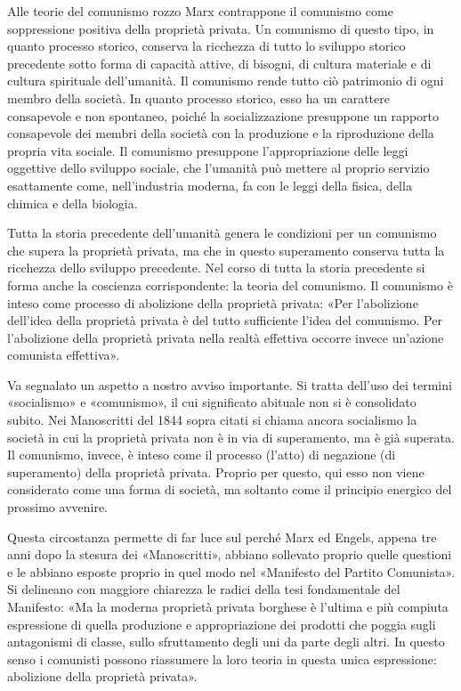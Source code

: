 \documentclass[12pt,a4paper,openany]{book}
\begin{document}
Alle teorie del comunismo rozzo Marx contrappone il comunismo come soppressione positiva della proprietà privata. Un comunismo di questo tipo, in quanto processo storico, conserva la ricchezza di tutto lo sviluppo storico precedente sotto forma di capacità attive, di bisogni, di cultura materiale e di cultura spirituale dell'umanità. Il comunismo rende tutto ciò patrimonio di ogni membro della società. In quanto processo storico, esso ha un carattere consapevole e non spontaneo, poiché la socializzazione presuppone un rapporto consapevole dei membri della società con la produzione e la riproduzione della propria vita sociale. Il comunismo presuppone l'appropriazione delle leggi oggettive dello sviluppo sociale, che l'umanità può mettere al proprio servizio esattamente come, nell'industria moderna, fa con le leggi della fisica, della chimica e della biologia.

Tutta la storia precedente dell'umanità genera le condizioni per un comunismo che supera la proprietà privata, ma che in questo superamento conserva tutta la ricchezza dello sviluppo precedente. Nel corso di tutta la storia precedente si forma anche la coscienza corrispondente: la teoria del comunismo. Il comunismo è inteso come processo di abolizione della proprietà privata: «Per l'abolizione dell'idea della proprietà privata è del tutto sufficiente l'idea del comunismo. Per l'abolizione della proprietà privata nella realtà effettiva occorre invece un'azione comunista effettiva».

Va segnalato un aspetto a nostro avviso importante. Si tratta dell'uso dei termini «socialismo» e «comunismo», il cui significato abituale non si è consolidato subito. Nei Manoscritti del 1844 sopra citati si chiama ancora socialismo la società in cui la proprietà privata non è in via di superamento, ma è già superata. Il comunismo, invece, è inteso come il processo (l'atto) di negazione (di superamento) della proprietà privata. Proprio per questo, qui esso non viene considerato come una forma di società, ma soltanto come il principio energico del prossimo avvenire.

Questa circostanza permette di far luce sul perché Marx ed Engels, appena tre anni dopo la stesura dei «Manoscritti», abbiano sollevato proprio quelle questioni e le abbiano esposte proprio in quel modo nel «Manifesto del Partito Comunista». Si delineano con maggiore chiarezza le radici della tesi fondamentale del Manifesto: «Ma la moderna proprietà privata borghese è l'ultima e più compiuta espressione di quella produzione e appropriazione dei prodotti che poggia sugli antagonismi di classe, sullo sfruttamento degli uni da parte degli altri. In questo senso i comunisti possono riassumere la loro teoria in questa unica espressione: abolizione della proprietà privata».
\end{document}
